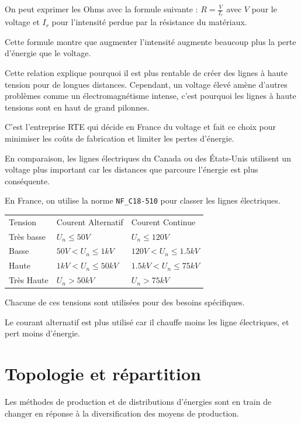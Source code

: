 On peut exprimer les Ohms avec la formule suivante : $R = \frac{V}{I_r}$
avec $V$ pour le voltage et $I_r$ pour l'intensité perdue par la résistance du matériaux.

Cette formule montre que augmenter l'intensité augmente beaucoup plus la perte d'énergie
que le voltage.

Cette relation explique pourquoi il est plus rentable de créer des lignes à haute tension
pour de longues distances.
Cependant, un voltage élevé amène d'autres problèmes comme un électromagnétisme intense,
c'est pourquoi les lignes à haute tensions sont en haut de grand pilonnes.

C'est l'entreprise RTE qui décide en France du voltage et fait ce choix pour minimiser les coûts de
fabrication et limiter les pertes d'énergie.

En comparaison, les lignes électriques du Canada ou des États-Unis utilisent un voltage
plus important car les distances que parcoure l'énergie est plus conséquente.

En France, on utilise la norme \texttt{NF\_C18-510} pour classer les lignes électriques.

\begin{table}[h]
  \begin{tabular}{|l|l|l|}
    Tension    & Courent Alternatif     & Courent Continue        \\
    Très basse & $U_n \leq 50V$         & $U_n \leq 120V$         \\
    Basse      & $50V < U_n \leq 1kV$   & $120V < U_n \leq 1.5kV$ \\
    Haute      & $1kV < U_n \leq 50kV$  & $1.5kV < U_n \leq 75kV$ \\
    Très Haute & $U_n > 50kV$           & $U_n > 75kV$            \\
  \end{tabular}
\end{table}

Chacune de ces tensions sont utilisées pour des besoins spécifiques.

Le courant alternatif est plus utilisé car il chauffe moins les ligne électriques,
et pert moins d'énergie.

\section{Topologie et répartition}

Les méthodes de production et de distributions d'énergies sont en train de changer en réponse
à la diversification des moyens de production.


